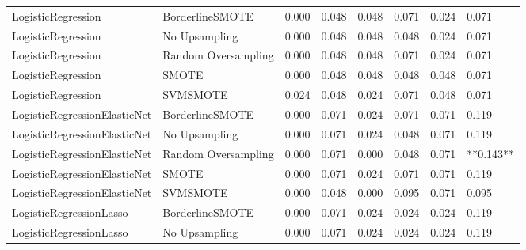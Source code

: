 \begin{tabular}{llllllll}
          LogisticRegression &     BorderlineSMOTE & 0.000 &                     0.048 &                 0.048 &                  0.071 &                                   0.024 &     0.071 \\
          LogisticRegression &       No Upsampling & 0.000 &                     0.048 &                 0.048 &                  0.048 &                                   0.024 &     0.071 \\
          LogisticRegression & Random Oversampling & 0.000 &                     0.048 &                 0.048 &                  0.071 &                                   0.024 &     0.071 \\
          LogisticRegression &               SMOTE & 0.000 &                     0.048 &                 0.048 &                  0.048 &                                   0.048 &     0.071 \\
          LogisticRegression &            SVMSMOTE & 0.024 &                     0.048 &                 0.024 &                  0.071 &                                   0.048 &     0.071 \\
LogisticRegressionElasticNet &     BorderlineSMOTE & 0.000 &                     0.071 &                 0.024 &                  0.071 &                                   0.071 &     0.119 \\
LogisticRegressionElasticNet &       No Upsampling & 0.000 &                     0.071 &                 0.024 &                  0.048 &                                   0.071 &     0.119 \\
LogisticRegressionElasticNet & Random Oversampling & 0.000 &                     0.071 &                 0.000 &                  0.048 &                                   0.071 & **0.143** \\
LogisticRegressionElasticNet &               SMOTE & 0.000 &                     0.071 &                 0.024 &                  0.071 &                                   0.071 &     0.119 \\
LogisticRegressionElasticNet &            SVMSMOTE & 0.000 &                     0.048 &                 0.000 &                  0.095 &                                   0.071 &     0.095 \\
     LogisticRegressionLasso &     BorderlineSMOTE & 0.000 &                     0.071 &                 0.024 &                  0.024 &                                   0.024 &     0.119 \\
     LogisticRegressionLasso &       No Upsampling & 0.000 &                     0.071 &                 0.024 &                  0.024 &                                   0.024 &     0.119 \\

\end{tabular}
